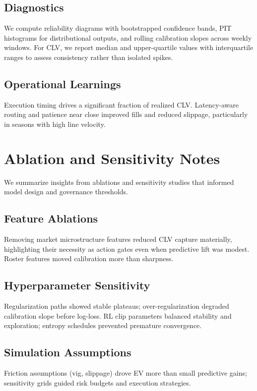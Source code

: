 \subsection{Diagnostics}
We compute reliability diagrams with bootstrapped confidence bands, PIT histograms for distributional outputs, and rolling calibration slopes across weekly windows. For CLV, we report median and upper-quartile values with interquartile ranges to assess consistency rather than isolated spikes.

\subsection{Operational Learnings}
Execution timing drives a significant fraction of realized CLV. Latency-aware routing and patience near close improved fills and reduced slippage, particularly in seasons with high line velocity.

\section{Ablation and Sensitivity Notes}\label{app:ablation}
We summarize insights from ablations and sensitivity studies that informed model design and governance thresholds.

\subsection{Feature Ablations}
Removing market microstructure features reduced CLV capture materially, highlighting their necessity as action gates even when predictive lift was modest. Roster features moved calibration more than sharpness.

\subsection{Hyperparameter Sensitivity}
Regularization paths showed stable plateaus; over-regularization degraded calibration slope before log-loss. RL clip parameters balanced stability and exploration; entropy schedules prevented premature convergence.

\subsection{Simulation Assumptions}
Friction assumptions (vig, slippage) drove EV more than small predictive gains; sensitivity grids guided risk budgets and execution strategies.

